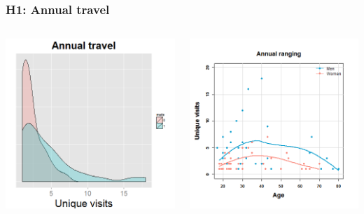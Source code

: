 \documentclass{beamer}
\begin{document}
\begin{frame}
\frametitle{H1: Annual travel}

\begin{columns}
\begin{column}{.5\textwidth}
\includegraphics[width= 1\textwidth]{mobtot_sex}
\end{column}

\begin{column}{.5\textwidth}
\includegraphics[width= 1.1\textwidth]{annualage}
\end{column}

\end{columns}

\end{frame}
\end{document}
